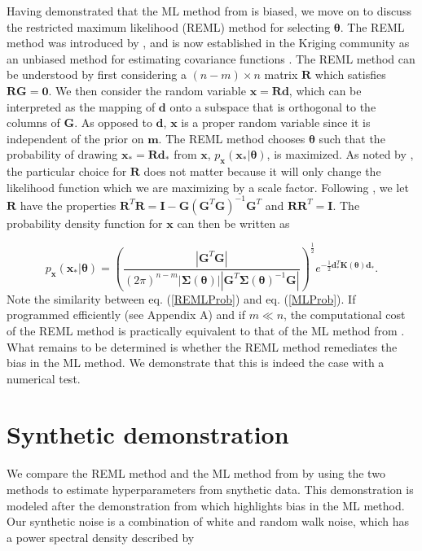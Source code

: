 \documentclass[10pt,a4paper]{article}
\begin{document}
Having demonstrated that the ML method from \citet{Langbein1997} is biased, we move on to discuss the restricted maximum likelihood (REML) method for selecting $\mathbf{\theta}$.  The REML method was introduced by \citet{Patterson1971}, and is now established in the Kriging community as an unbiased method for estimating covariance functions \citep[e.g.][]{Cressie1992}. The REML method can be understood by first considering a $(n-m)\times n$ matrix $\mathbf{R}$ which satisfies $\mathbf{R}\mathbf{G}=\mathbf{0}$.  We then consider the random variable $\mathbf{x}=\mathbf{R}\mathbf{d}$, which can be interpreted as the mapping of $\mathbf{d}$ onto a subspace that is orthogonal to the columns of $\mathbf{G}$. As opposed to $\mathbf{d}$, $\mathbf{x}$ is a proper random variable since it is independent of the prior on $\mathbf{m}$. The REML method chooses $\mathbf{\theta}$ such that the probability of drawing $\mathbf{x}_*=\mathbf{R}\mathbf{d}_*$ from $\mathbf{x}$, $p_\mathbf{x}(\mathbf{x}_*|\mathbf{\theta})$, is maximized. As noted by \citet{Harville1974}, the particular choice for $\mathbf{R}$ does not matter because it will only change the likelihood function which we are maximizing by a scale factor. Following \citet{Harville1974}, we let $\mathbf{R}$ have the properties $\mathbf{R}^T\mathbf{R} = \mathbf{I} - \mathbf{G}(\mathbf{G}^T\mathbf{G})^{-1}\mathbf{G}^T$ and $\mathbf{R}\mathbf{R}^T = \mathbf{I}$. The probability density function for $\mathbf{x}$ can then be written as 

\begin{equation}\label{REMLProb}
p_\mathbf{x}(\mathbf{x}_*|\mathbf{\theta}) =
\left(\frac{\left|\mathbf{G}^T\mathbf{G}\right|}
           {(2\pi)^{n-m}
            \left| \mathbf{\Sigma}(\mathbf{\theta}) \right| 
            \left| \mathbf{G}^T\mathbf{\Sigma}(\mathbf{\theta})^{-1}\mathbf{G} \right|}\right)^{\frac{1}{2}} 
e^{-\tfrac{1}{2}\mathbf{d}_*^T\mathbf{K}(\mathbf{\theta})\mathbf{d}_*} .
\end{equation}
Note the similarity between eq. (\ref{REMLProb}) and eq. (\ref{MLProb}). If programmed efficiently (see Appendix A) and if $m \ll n$, the computational cost of the REML method is practically equivalent to that of the ML method from \citet{Langbein1997}. What remains to be determined is whether the REML method remediates the bias in the ML method. We demonstrate that this is indeed the case with a numerical test. 

\section{Synthetic demonstration}
We compare the REML method and the ML method from \citet{Langbein1997} by using the two methods to estimate hyperparameters from snythetic data. This demonstration is modeled after the demonstration from \citet{Langbein2012} which highlights bias in the ML method. Our synthetic noise is a combination of white and random walk noise, which has a power spectral density described by
\end{document}
